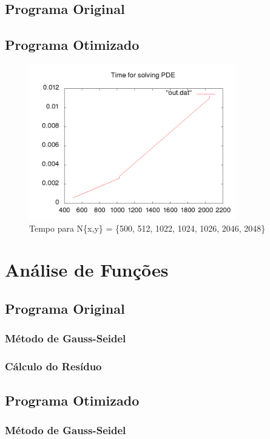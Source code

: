 \documentclass[12pt]{article}
\begin{document}
	\subsection{Programa Original}
	

	\subsection{Programa Otimizado}
	\begin{figure}[ht!]
		\centering
		\includegraphics[width=90mm]{newtime.png}
		\caption{Tempo para N\{x,y\} = \{500, 512, 1022, 1024, 1026, 2046, 2048\} 			\label{overflow}}
	\end{figure}
\newpage

\section{Análise de Funções}

	\subsection{Programa Original}
		\subsubsection{Método de Gauss-Seidel}
		\subsubsection{Cálculo do Resíduo}
	
	\subsection{Programa Otimizado}
		\subsubsection{Método de Gauss-Seidel}
\end{document}
